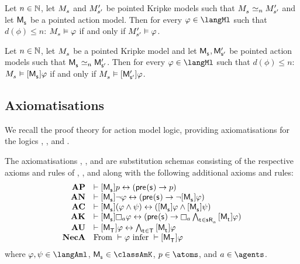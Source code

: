 \begin{proposition}
Let $n \in \mathbb{N}$,
let $\kPModel{\kStateS}$ and ${M^{\prime}_{{s}^{\prime}}}$ be pointed Kripke models such that $\kPModel{\kStateS} \bisimilar[n] \kPModelP{\kStateSP}$ and
let $\aPModel{\aStateS}$ be a pointed action model.
Then for every $\phi \in \langMl$ such that $d(\phi) \leq n$: $\kPModel{\kStateS} \entails \phi$ if and only if ${M^{\prime}_{{s}^{\prime}}} \vDash \varphi$.
\end{proposition}

\begin{proposition}
Let $n \in \mathbb{N}$,
let $\kPModel{\kStateS}$ be a pointed Kripke model and
let $\aPModel{\aStateS}, \aPModelP{\aStateSP}$ be pointed action models such that $\aPModel{\aStateS} \bisimilar[n] \aPModelP{\aStateSP}$.
Then for every $\phi \in \langMl$ such that $d(\phi) \leq n$: $\kPModel{\kStateS} \entails \actionA{\aPModel{\aStateS}} \phi$ if and only if $\kPModel{\kStateS} \entails \actionA{\aPModelP{\aStateSP}} \phi$.
\end{proposition}

\subsection{Axiomatisations}

We recall the proof theory for action model logic, providing axiomatisations for the logics \logicAmlK{}, \logicAmlKFF{}, and \logicAmlS{}.

\begin{definition}
The axiomatisations \axiomAmlK{}, \axiomAmlKFF{}, and \axiomAmlS{} are substitution schemas consisting of the respective axioms and rules of \axiomK{}, \axiomKFF{}, and \axiomS{} along with the following additional axioms and rules:
$$
\begin{array}{rl}
    {\bf AP} & \proves \actionA{\aPModel{\aStateS}} \atomP \iff (\aPrecondition(\aStateS) \implies \atomP)\\
    {\bf AN} & \proves \actionA{\aPModel{\aStateS}} \lnot \phi \iff (\aPrecondition(\aStateS) \implies \lnot \actionA{\aPModel{\aStateS}} \phi)\\
    {\bf AC} & \proves \actionA{\aPModel{\aStateS}} (\phi \land \psi) \iff (\actionA{\aPModel{\aStateS}} \phi \land \actionA{\aPModel{\aStateS}} \psi)\\
    {\bf AK} & \proves \actionA{\aPModel{\aStateS}} \necessaryA \phi \iff (\aPrecondition(\aStateS) \implies \necessaryA \bigwedge_{\aStateT \in \aSuccessorsA{\aStateS}} \actionA{\aPModel{\aStateT}} \phi)\\
    {\bf AU} & \proves \actionA{\aPModel{\aStatesT}} \phi \iff \bigwedge_{\aStateT \in \aStatesT} \actionA{\aPModel{\aStateT}} \phi\\
    {\bf NecA} & \text{From } \proves \phi \text{ infer } \proves \actionA{\aPModel{\aStatesT}} \phi
\end{array}
$$
where $\phi, \psi \in \langAml$, $\aPModel{\aStateS} \in \classAmK$, $\atomP \in \atoms$, and $\agentA \in \agents$.
\end{definition}

